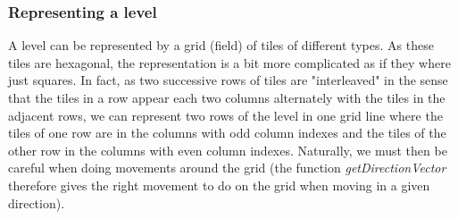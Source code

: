 \documentclass[a4paper, 12pt, titlepage]{article}
\begin{document}
\subsubsection{Representing a level}
A level can be represented by a grid (field) of tiles of different types. As
these tiles are hexagonal, the representation is a bit more complicated as if
they where just squares. In fact, as two successive rows of tiles are
"interleaved" in the sense that the tiles in a row appear each two columns
alternately with the tiles in the adjacent rows, we can represent two rows of
the level in one grid line where the tiles of one row are in the columns with
odd column indexes and the tiles of the other row in the columns with even
column indexes. Naturally, we must then be careful when doing movements around
the grid (the function {\em getDirectionVector} therefore gives the right
movement to do on the grid when moving in a given direction).
\end{document}

